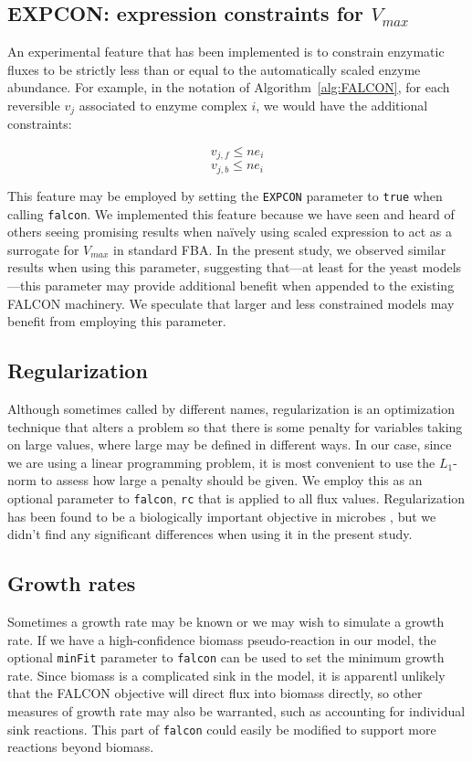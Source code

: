 \subsection{EXPCON: expression constraints for $V_{max}$}
An experimental feature that has been implemented is to constrain
enzymatic fluxes to be strictly less than or equal to the
automatically scaled enzyme abundance. For example, in the
notation of Algorithm~\ref{alg:FALCON}, for each reversible $v_j$
associated to enzyme complex $i$, we would have the additional
constraints:

\[ v_{j,f} \leq n e_i \]
\[ v_{j,b} \leq n e_i \]

This feature may be employed by setting the \texttt{EXPCON} parameter
to \texttt{true} when calling \texttt{falcon}. We implemented this
feature because we have seen and heard of others seeing promising
results when na\"ively using scaled expression to act as a surrogate for
$V_{max}$ in standard FBA. In the present study, we observed similar
results when using this parameter, suggesting that---at least for the
yeast models---this parameter may provide additional benefit when
appended to the existing FALCON machinery. We speculate that larger
and less constrained models may benefit from employing this parameter.

\subsection{Regularization}
Although sometimes called by different names, regularization is an
optimization technique that alters a problem so that there is some
penalty for variables taking on large values, where large may be
defined in different ways. In our case, since we are using a linear
programming problem, it is most convenient to use the $L_1$-norm to
assess how large a penalty should be given. We employ this as an
optional parameter to \texttt{falcon}, \texttt{rc} that is applied to
all flux values.  Regularization has been found to be a biologically
important objective in microbes \citep{Schuetz2012}, but we didn't
find any significant differences when using it in the present study.

\subsection{Growth rates}
Sometimes a growth rate may be known or we may wish to simulate a
growth rate. If we have a high-confidence biomass pseudo-reaction in
our model, the optional \texttt{minFit} parameter to \texttt{falcon}
can be used to set the minimum growth rate. Since biomass is a
complicated sink in the model, it is apparentl unlikely that the
FALCON objective will direct flux into biomass directly, so other
measures of growth rate may also be warranted, such as accounting
for individual sink reactions. This part of \texttt{falcon} could
easily be modified to support more reactions beyond biomass.

